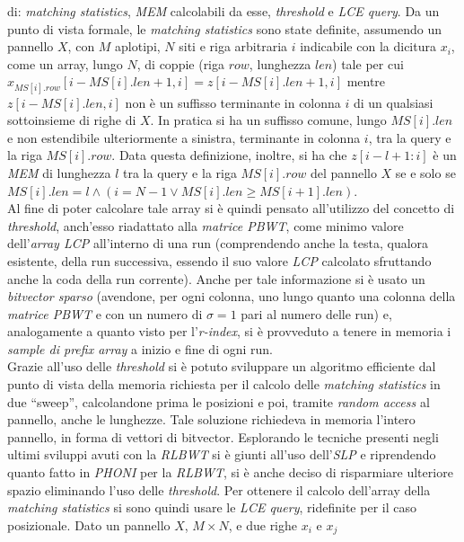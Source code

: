 \documentclass[a4paper,11pt, oneside]{article}
\begin{document}
di: \textit{matching statistics}, \textit{MEM} 
calcolabili da esse, \textit{threshold} e \textit{LCE query}. Da un punto
di vista formale, le \textit{matching statistics}
sono state definite, assumendo un pannello $X$, con $M$ aplotipi, $N$ siti e
riga arbitraria $i$ indicabile con la dicitura $x_i$, come un array, lungo $N$,
di 
coppie (riga $row$, lunghezza $len$) tale per cui
$x_{MS[i].row}[i-MS[i].len+1,i]=z[i-MS[i].len+1,i]$ mentre $z[i-MS[i].len,i]$
non è un suffisso terminante in colonna $i$ di un qualsiasi sottoinsieme di
righe di $X$. In pratica si ha un suffisso comune, lungo $MS[i].len$ e non
estendibile ulteriormente a sinistra, terminante in
colonna $i$, tra la query e la riga $MS[i].row$. Data questa definizione,
inoltre, si ha che $z[i-l+1:i]$ 
è un \textit{MEM} di lunghezza $l$ tra la query e la riga $MS[i].row$ del
pannello $X$ se e solo se  $MS[i].len=l\land(i=N-1\lor MS[i].len\geq
MS[i+1].len)$.\\ 
Al fine di poter calcolare tale array si è quindi pensato all'utilizzo del
concetto di \textit{threshold}, anch'esso riadattato alla \textit{matrice PBWT},
come minimo valore dell'\textit{array LCP} all'interno di una run (comprendendo
anche la testa, qualora esistente, della run successiva, essendo il suo valore
\textit{LCP} calcolato sfruttando anche la coda della run corrente). Anche per
tale informazione si è usato un \textit{bitvector sparso} (avendone, per ogni
colonna, uno lungo quanto una colonna della \textit{matrice PBWT} e con un
numero di $\sigma=1$ pari al numero delle run) e, analogamente a
quanto visto per l'\textit{r-index}, si è provveduto a 
tenere in memoria i \textit{sample di prefix array} a inizio e fine di ogni
run.\\ 
Grazie all'uso delle \textit{threshold} si è potuto sviluppare un algoritmo
efficiente dal punto di vista della memoria richiesta per il calcolo delle
\textit{matching statistics} in due ``sweep'', calcolandone prima le posizioni e
poi, tramite \textit{random access} al pannello, anche le
lunghezze. Tale soluzione richiedeva in memoria
l'intero pannello, in forma di vettori di
bitvector. Esplorando le tecniche presenti negli ultimi sviluppi avuti con la
\textit{RLBWT} si è giunti all'uso 
dell'\textit{SLP} e riprendendo quanto fatto in \textit{PHONI} per
la \textit{RLBWT}, si è anche deciso di risparmiare ulteriore spazio eliminando
l'uso delle \textit{threshold}. Per ottenere il calcolo dell'array della
\textit{matching 
  statistics} si sono quindi usare le \textit{LCE query}, ridefinite per il
caso posizionale. Dato un pannello $X$, $M\times N$, e due righe $x_i$ e $x_j$
\end{document}
